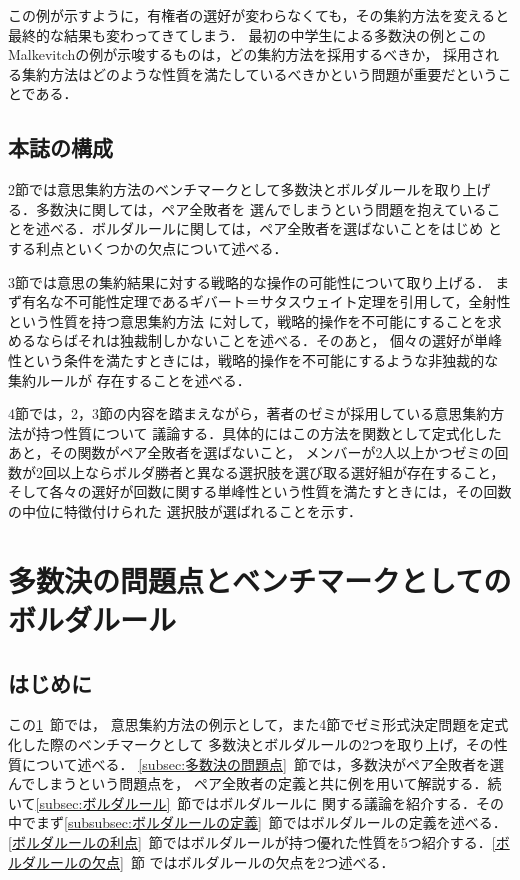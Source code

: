 \documentclass[dvipdfmx]{jsarticle}
\begin{document}
この例が示すように，有権者の選好が変わらなくても，その集約方法を変えると最終的な結果も変わってきてしまう．
最初の中学生による多数決の例とこのMalkevitchの例が示唆するものは，どの集約方法を採用するべきか，
採用される集約方法はどのような性質を満たしているべきかという問題が重要だということである．

\subsection{本誌の構成}
2節では意思集約方法のベンチマークとして多数決とボルダルールを取り上げる．多数決に関しては，ペア全敗者を
選んでしまうという問題を抱えていることを述べる．ボルダルールに関しては，ペア全敗者を選ばないことをはじめ
とする利点といくつかの欠点について述べる．

3節では意思の集約結果に対する戦略的な操作の可能性について取り上げる．
まず有名な不可能性定理であるギバート＝サタスウェイト定理を引用して，全射性という性質を持つ意思集約方法
に対して，戦略的操作を不可能にすることを求めるならばそれは独裁制しかないことを述べる．そのあと，
個々の選好が単峰性という条件を満たすときには，戦略的操作を不可能にするような非独裁的な集約ルールが
存在することを述べる．

4節では，2，3節の内容を踏まえながら，著者のゼミが採用している意思集約方法が持つ性質について
議論する．具体的にはこの方法を関数として定式化したあと，その関数がペア全敗者を選ばないこと，
メンバーが2人以上かつゼミの回数が2回以上ならボルダ勝者と異なる選択肢を選び取る選好組が存在すること，
そして各々の選好が回数に関する単峰性という性質を満たすときには，その回数の中位に特徴付けられた
選択肢が選ばれることを示す．

\section{多数決の問題点とベンチマークとしてのボルダルール}\label{sec:多数決の問題点とベンチマークとしてのボルダルール}
\subsection{はじめに}
この\ref{sec:多数決の問題点とベンチマークとしてのボルダルール}~節では，
意思集約方法の例示として，また4節でゼミ形式決定問題を定式化した際のベンチマークとして
多数決とボルダルールの2つを取り上げ，その性質について述べる．
\ref{subsec:多数決の問題点}~節では，多数決がペア全敗者を選んでしまうという問題点を，
ペア全敗者の定義と共に例を用いて解説する．続いて\ref{subsec:ボルダルール}~節ではボルダルールに
関する議論を紹介する．その中でまず\ref{subsubsec:ボルダルールの定義}~節ではボルダルールの定義を述べる．
\ref{ボルダルールの利点}~節ではボルダルールが持つ優れた性質を5つ紹介する．\ref{ボルダルールの欠点}~節
ではボルダルールの欠点を2つ述べる．
\end{document}

